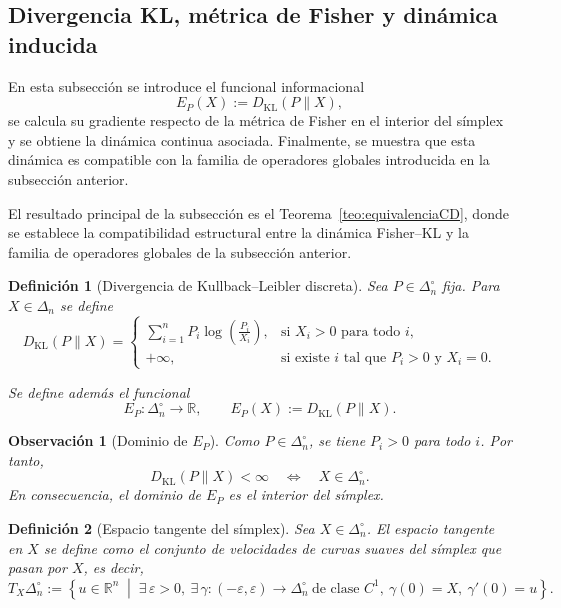 \documentclass[12pt]{article}
\newtheorem{definicion}{Definición}[section]
\newtheorem{observacion}{Observación}[section]
\begin{document}
\subsection{Divergencia KL, métrica de Fisher y dinámica inducida}

En esta subsección se introduce el funcional informacional
\[
E_P(X):=D_{\mathrm{KL}}(P\|X),
\]
se calcula su gradiente respecto de la métrica de Fisher en el interior del símplex y se obtiene la dinámica continua asociada. Finalmente, se muestra que esta dinámica es compatible con la familia de operadores globales introducida en la subsección anterior.

El resultado principal de la subsección es el Teorema~\ref{teo:equivalenciaCD}, donde se establece la compatibilidad estructural entre la dinámica Fisher--KL y la familia de operadores globales de la subsección anterior.

\begin{definicion}[Divergencia de Kullback--Leibler discreta]\label{def:KL}
Sea $P\in\Delta_n^\circ$ fija. Para $X\in\Delta_n$ se define
\[
D_{\mathrm{KL}}(P\|X)
=
\begin{cases}
\displaystyle \sum_{i=1}^n P_i\log\!\left(\frac{P_i}{X_i}\right),
& \text{si } X_i>0 \text{ para todo } i,\\[1em]
+\infty,
& \text{si existe } i \text{ tal que } P_i>0 \text{ y } X_i=0.
\end{cases}
\]

Se define además el funcional
\[
E_P:\Delta_n^\circ\to\mathbb R,
\qquad
E_P(X):=D_{\mathrm{KL}}(P\|X).
\]
\end{definicion}

\begin{observacion}[Dominio de $E_P$]\label{obs:KLsoporte}
Como $P\in\Delta_n^\circ$, se tiene $P_i>0$ para todo $i$. Por tanto,
\[
D_{\mathrm{KL}}(P\|X)<\infty
\quad\Longleftrightarrow\quad
X\in\Delta_n^\circ.
\]
En consecuencia, el dominio de $E_P$ es el interior del símplex.
\end{observacion}

\begin{definicion}[Espacio tangente del símplex]\label{def:tangente}
Sea $X\in\Delta_n^\circ$. El \emph{espacio tangente en $X$} se define como el conjunto de velocidades de curvas suaves del símplex que pasan por $X$, es decir,
\[
T_X\Delta_n^\circ
:=
\left\{
u\in\mathbb R^n
\;\middle|\;
\exists\,\varepsilon>0,\ \exists\,\gamma:(-\varepsilon,\varepsilon)\to\Delta_n^\circ
\ \text{de clase } C^1,\ 
\gamma(0)=X,\ 
\gamma'(0)=u
\right\}.
\]
\end{definicion}
\end{document}
